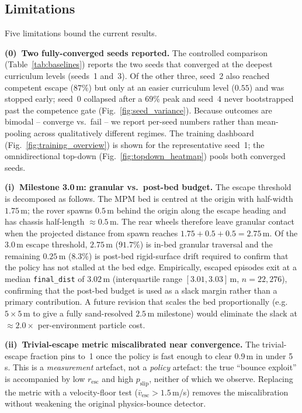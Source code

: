 \documentclass[conference]{IEEEtran}
\begin{document}
\subsection{Limitations}

Five limitations bound the current results.

\textbf{(0)~Two fully-converged seeds reported.}
The controlled comparison (Table~\ref{tab:baselines}) reports the two seeds that
converged at the deepest curriculum levels (seeds~1 and~3). Of the other three,
seed~2 also reached competent escape ($87\%$) but only at an easier curriculum
level ($0.55$) and was stopped early; seed~0 collapsed after a $69\%$ peak and
seed~4 never bootstrapped past the competence gate (Fig.~\ref{fig:seed_variance}).
Because outcomes are bimodal -- converge vs.\ fail -- we report per-seed numbers
rather than mean-pooling across qualitatively different regimes. The training
dashboard (Fig.~\ref{fig:training_overview}) is shown for the representative
seed~1; the omnidirectional top-down (Fig.~\ref{fig:topdown_heatmap}) pools both
converged seeds.


\textbf{(i)~Milestone 3.0\,m: granular vs.\ post-bed budget.}
The escape threshold is decomposed as follows. The MPM bed is centred at the
origin with half-width $1.75$\,m; the rover spawns $0.5$\,m behind the origin
along the escape heading and has chassis half-length ${\approx}0.5$\,m. The
rear wheels therefore leave granular contact when the projected distance from
spawn reaches $1.75 + 0.5 + 0.5 = 2.75$\,m. Of the $3.0$\,m escape threshold,
$2.75$\,m ($91.7\%$) is in-bed granular traversal and the remaining
$0.25$\,m ($8.3\%$) is post-bed rigid-surface drift required to confirm that
the policy has not stalled at the bed edge. Empirically, escaped episodes
exit at a median \texttt{final\_dist} of $3.02$\,m (interquartile range
$[3.01, 3.03]$\,m, $n{=}22{,}276$), confirming that the post-bed budget is
used as a slack margin rather than a primary contribution. A future revision
that scales the bed proportionally (e.g.\ $5{\times}5$\,m to give a fully
sand-resolved $2.5$\,m milestone) would eliminate the slack at
${\approx}2.0{\times}$ per-environment particle cost.

\textbf{(ii)~Trivial-escape metric miscalibrated near convergence.}
The trivial-escape fraction pins to~1 once the policy is fast enough to clear
0.9\,m in under 5\,s. This is a \emph{measurement} artefact, not a
\emph{policy} artefact: the true ``bounce exploit'' is accompanied by low
$r_\text{esc}$ and high $p_\text{slip}$, neither of which we observe.
Replacing the metric with a velocity-floor test
($\bar{v}_{\text{esc}} > 1.5$\,m/s) removes the miscalibration without
weakening the original physics-bounce detector.
\end{document}
